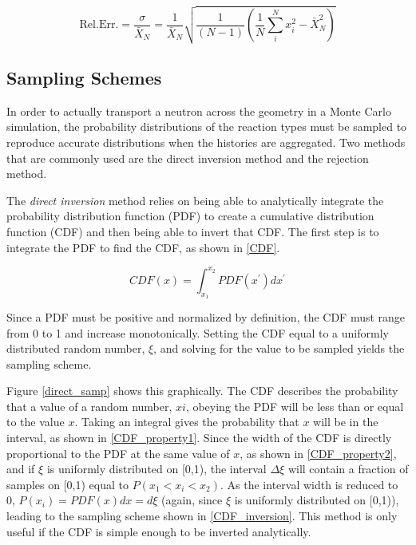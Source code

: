 \begin{equation}
\label{rel_err}
\mathrm{Rel. Err.} = \frac{\sigma}{\bar{X}_N} = \frac{1}{\bar{X}_N}\sqrt{\frac{1}{(N-1)} \left( \frac{1}{N}\sum_i^N x_i^2-\bar{X}_N^2 \right)}
\end{equation}

\subsection{Sampling Schemes}

In order to actually transport a neutron across the geometry in a Monte Carlo simulation, the probability distributions of the reaction types must be sampled to reproduce accurate distributions when the histories are aggregated.  Two methods that are commonly used are the direct inversion method and the rejection method.  

The \emph{direct inversion} method relies on being able to analytically integrate the probability distribution function (PDF) to create a cumulative distribution function (CDF) and then being able to invert that CDF.  The first step is to integrate the PDF to find the CDF, as shown in \eqref{CDF}.

\begin{equation}
\label{CDF}
CDF(x) = \int_{x_1}^{x_2} PDF(x^\prime) dx^\prime
\end{equation}

Since a PDF must be positive and normalized by definition, the CDF must range from 0 to 1 and increase monotonically.  Setting the CDF equal to a uniformly distributed random number, $\xi$, and solving for the value to be sampled yields the sampling scheme.  

Figure \ref{direct_samp} shows this graphically.  The CDF describes the probability that a value of a random number, $xi$, obeying the PDF will be less than or equal to the value $x$.  Taking an integral gives the probability that $x$ will be in the interval, as shown in \eqref{CDF_property1}.  Since the width of the CDF is directly proportional to the PDF at the same value of $x$, as shown in \eqref{CDF_property2}, and if $\xi$ is uniformly distributed on [0,1), the interval $\Delta \xi$ will contain a fraction of samples on [0,1) equal to $P( x_1 < x_i < x_2)$.  As the interval width is reduced to 0, $P(x_i)= PDF(x)dx = d\xi$ (again, since $\xi$ is uniformly distributed on [0,1)), leading to the sampling scheme shown in \eqref{CDF_inversion}.  This method is only useful if the CDF is simple enough to be inverted analytically.

